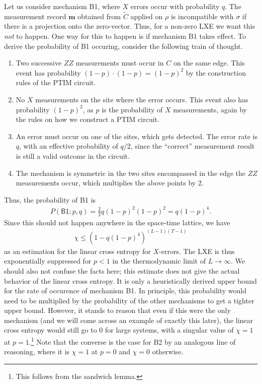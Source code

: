 Let us consider mechanism \textsf{B1}, where $X$ errors occur with probability
$q$.
The measurement record $\mathbf{m}$ obtained from $\tilde{C}$ applied on $\rho$
is incompatible with $\sigma$ if there is a projection onto the zero-vector.
Thus, for a non-zero LXE we want this \emph{not} to happen. One way for this to happen
is if mechanism \textsf{B1} takes effect. To derive the probability of
\textsf{B1} occuring, consider the following train of thought.

\begin{enumerate}
  \item Two successive $ZZ$ measurements must occur in $C$ on the same edge. This event has probability
    $(1-p)\cdot (1-p)= (1-p)^2$ by the construction rules of the PTIM circuit.
  \item No $X$ measurements on the site where the error occurs. This event also
    has probability $(1-p)^2$, as $p$ is the probability of $X$ measurements,
    again by the rules on how we construct a PTIM circuit.
  \item An error must occur on one of the sites, which gets detected. The error
    rate is $q$, with an effective probability of $q /2$, since the
    \enquote{correct} measurement result is still a valid outcome in the
    circuit.
  \item The mechanism is symmetric in the two sites encompassed in the edge the
    $ZZ$ measurements occur, which multiplies the above points by 2.
\end{enumerate}

Thus, the probability of \textsf{B1} is
\begin{align}
  P(\textsf{B1}; p,q) = \frac{2}{2} q \left(1-p\right)^2\left(1-p\right)^2 = q\left(
  1-p\right)^4
.\end{align}
Since this should not happen anywhere in the space-time lattice, we have
\begin{align}\label{eq:lxe-estimate}
      \chi \leq \left( 1-q\left( 1-p \right)^4  \right)^{(L-1)(T-1)}
\end{align}
as an estimation for the linear cross entropy for $X$-errors.
The LXE is thus exponentially suppressed for $p<1$ in the thermodynamic limit
of $L \to \infty$. We should also not confuse the facts here; this estimate
does not give the actual behavior of the linear cross entropy.  It is only a
heuristically derived upper bound for the rate of occurence of mechanism
\textsf{B1}. In principle, this probability would need to be multiplied by the
probability of the other mechanisms to get a tighter upper bound. However, it
stands to reason that even if this were the only mechanism (and we will come
across an example of exactly this later), the linear cross entropy would still
go to $0$ for large systems, with a singular value of $\chi=1$ at
$p=1$.\footnote{This follows from the sandwich lemma.} Note that the converse
is the case for \textsf{B2} by an analogous line of reasoning, where it is
$\chi=1$ at $p=0$ and $\chi=0$ otherwise. 

